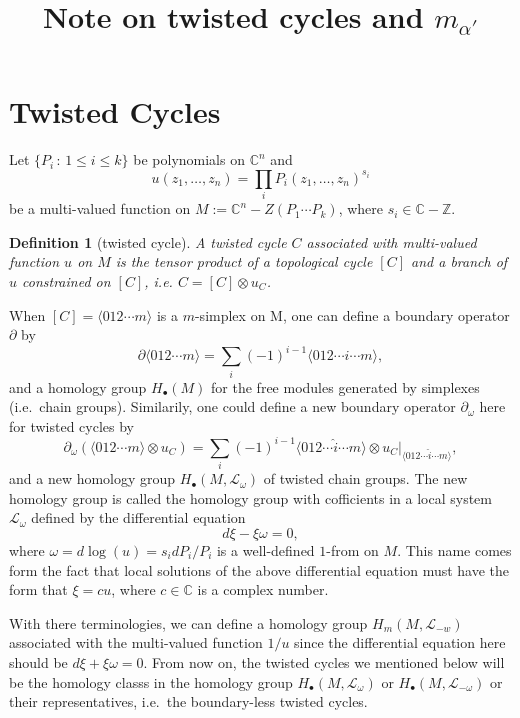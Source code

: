 \documentclass[11pt]{article}
\title{Note on twisted cycles and $m_{\alpha'}$}
\newcommand{\zz}{\mathbb{Z}}
\newcommand{\cc}{\mathbb{C}}
\theoremstyle{definition}
\theoremstyle{plain}
\newtheorem{defi}[para]{Definition}
\begin{document}
\maketitle

\section{Twisted Cycles}

Let $\{P_i\,:\,1\leq i \leq k\}$ be polynomials on $\cc^n$ and 
\[
	u(z_1,\dots,z_n)=\prod_i P_i(z_1,\dots,z_n)^{s_i}
\]
be a multi-valued function on $M:=\cc^n-Z(P_1\cdots P_k)$, 
where $s_i\in \cc-\zz$.

\begin{defi}[twisted cycle]
A twisted cycle $C$ associated with multi-valued function $u$ 
on $M$ is
the tensor product of a topological cycle $[C]$ and a 
branch of $u$ constrained on $[C]$, i.e. $C=[C]\otimes u_C$.
\end{defi}

When $[C]=\langle 012\cdots m\rangle$ is a $m$-simplex on M, one can
define a boundary operator $\partial$ by
\[
	\partial \langle 012\cdots m\rangle=\sum_i (-1)^{i-1}
	\langle 012\cdots \hat{i}\cdots m\rangle,
\]
and a homology group $H_{\bullet}(M)$ for the free modules
generated by simplexes (i.e.~chain groups). 
Similarily, one could define a new boundary operator 
$\partial_\omega$ here for twisted cycles by
\[
	\partial_\omega (\langle 012\cdots m\rangle\otimes u_C)
	=\sum_i (-1)^{i-1}\langle 012\cdots \hat{i}\cdots m\rangle\otimes 
	u_C|_{\langle 012\cdots \hat{i}\cdots m\rangle},
\]
and a new homology group $H_{\bullet}(M,\mathcal L_\omega)$ of 
twisted chain groups. The new homology group is called
the homology group with cofficients in a local system 
$\mathcal L_\omega$ defined by the differential equation
\[
	d \xi -\xi \omega=0,
\]
where $\omega=d \log(u)=s_idP_i/P_i$ is a well-defined $1$-from
on $M$. This name comes form the fact that local solutions 
of the above differential equation must have the form that 
$\xi = cu$, where $c\in \cc$ is a complex number.

With there terminologies, we can define a homology group 
$H_m(M,\mathcal L_{-w})$ associated with the multi-valued 
function $1/u$ since the differential equation here should 
be $d \xi +\xi \omega=0$. From now on, the twisted cycles 
we mentioned below will be the homology classs in the homology 
group $H_{\bullet}(M,\mathcal L_\omega)$ or 
$H_{\bullet}(M,\mathcal L_{-\omega})$ or their representatives,
i.e.~the boundary-less twisted cycles.
\end{document}
